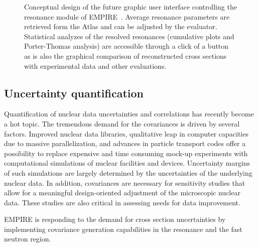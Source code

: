 \documentclass[twocolumn,amsmath,amssymb,10pt,groupedaddress,a4paper]{revtex4}
\begin{document}
\begin{figure}[htpb]
\caption{\label{fig:res-GUI}Conceptual design of the future graphic user interface controlling the resonance module of EMPIRE~\cite{Cho:07}. Average resonance parameters are retrieved form the Atlas and can be adjusted by the evaluator. Statistical analyzes of the resolved resonances (cumulative plots and Porter-Thomas analysis) are accessible through a click of a button as is also the graphical comparison of reconstructed cross sections with experimental data and other evaluations.}
\end{figure}

\subsection{Uncertainty quantification}
Quantification of nuclear data uncertainties and correlations has recently become a hot topic. The tremendous demand for the covariances is driven by several factors.  Improved nuclear data libraries, qualitative leap in computer capacities due to massive parallelization, and advances in particle transport codes offer a possibility to replace expensive and time consuming mock-up experiments with computational simulations of nuclear facilities and devices. Uncertainty margins of such simulations are largely determined by the uncertainties of the underlying nuclear data. In addition, covariances are necessary for sensitivity studies that allow for a meaningful design-oriented adjustment of the microscopic nuclear data. These studies are also critical in assessing needs for data improvement.

EMPIRE is responding to the demand for cross section uncertainties by implementing covariance generation capabilities in the resonance and the fast neutron region.
\end{document}

